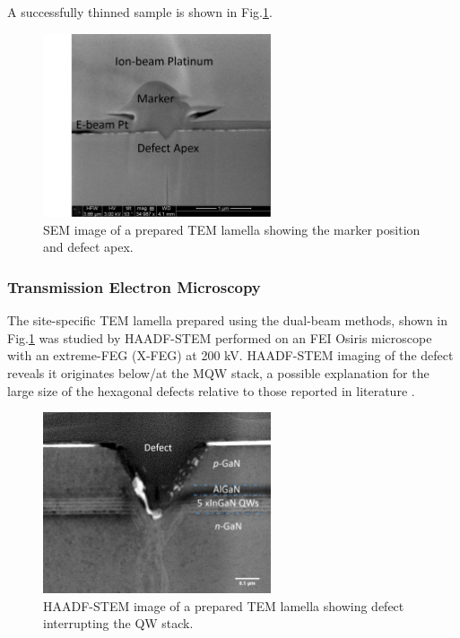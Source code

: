 A successfully thinned sample is shown in Fig.\ref{thinned}.

\begin{figure}[h]
	\centering
	\includegraphics[width=0.6\textwidth]{Figs/Ch3/thinned}
	\caption[h] {SEM image of a prepared TEM lamella showing the marker position and defect apex.}
	\label{thinned}
\end{figure}
\FloatBarrier 


\subsubsection{Transmission Electron Microscopy}

The site-specific TEM lamella prepared using the dual-beam methods, shown in Fig.\ref{thinned} was studied by HAADF-STEM performed on an FEI Osiris microscope with an extreme-FEG (X-FEG)  at 200 kV. HAADF-STEM imaging of the defect reveals it originates below/at the MQW stack, a possible explanation for the large size of the hexagonal defects relative to those reported in literature \cite{Hangleiter2005,Tsai2007,Oliver2006a}. 

\begin{figure}[h]
	\centering
	\includegraphics[width=0.6\textwidth]{Figs/Ch3/STEM-spot}
	\caption[h] {HAADF-STEM image of a prepared TEM lamella showing defect interrupting the QW stack.}
	\label{STEM-spot}
\end{figure}
\FloatBarrier 

